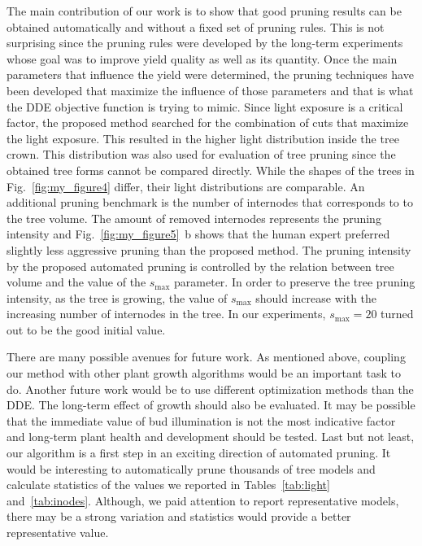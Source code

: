 The main contribution of our work is to show that good pruning results
can be obtained automatically and without a fixed set of pruning rules.
This is not surprising since the pruning rules were developed by the
long-term experiments whose goal was to improve yield quality as well as
its quantity. Once the main parameters that influence the yield were
determined, the pruning techniques have been developed that maximize the
influence of those parameters and that is what the DDE objective
function is trying to mimic. Since light exposure is a critical
factor, the proposed method searched for the combination of cuts that
maximize the light exposure. This resulted in the higher light
distribution inside the tree crown. This distribution was also used for
evaluation of tree pruning since the obtained tree forms cannot be
compared directly. While the shapes of the trees in Fig.~\ref{fig:my_figure4} differ,
their light distributions are comparable. An additional pruning
benchmark is the number of internodes that corresponds to to the tree volume. 
The amount of removed internodes represents  the
pruning intensity and Fig.~\ref{fig:my_figure5}~b shows that the human expert preferred
slightly less aggressive pruning than the proposed method. The pruning
intensity by the proposed automated pruning is controlled by the
relation between tree volume and the value of the \(s_{\mathrm{\max}}\)
parameter. In order to preserve the tree pruning intensity, as the tree
is growing, the value of \(s_{\mathrm{\max}}\) should increase with the
increasing number of internodes in the tree. In our experiments, \(s_{\mathrm{\max}}=20\)
turned out to be the good initial value.

There are many possible avenues for future work. As mentioned above, coupling our method with other 
plant growth algorithms would be an important task to do. Another future work would be to use different optimization methods than the DDE. The long-term effect of growth should also be evaluated. It may be possible that the immediate value of bud illumination is not the most indicative factor and long-term plant health and development should be tested. Last but not least, our algorithm is a first step in an exciting direction of automated pruning. It would be interesting to automatically prune thousands of tree models and calculate statistics of the values we reported in Tables~\ref{tab:light} and~\ref{tab:inodes}. Although, we paid attention to report representative models, there may be a strong variation and statistics would provide a better representative value.